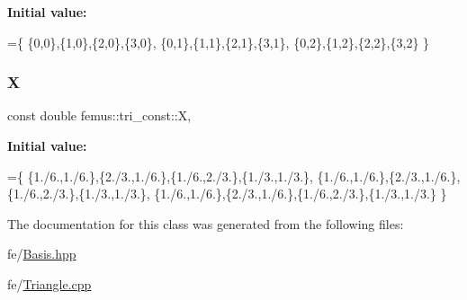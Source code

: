 {\bfseries Initial value\+:}
\begin{DoxyCode}
=\{ 
    \{0,0\},\{1,0\},\{2,0\},\{3,0\},
    \{0,1\},\{1,1\},\{2,1\},\{3,1\},
    \{0,2\},\{1,2\},\{2,2\},\{3,2\}
  \}
\end{DoxyCode}
\mbox{\label{classfemus_1_1tri__const_abfe45c8c83921a5fc439a70b3f30aa10}} 
\subsubsection{\texorpdfstring{X}{X}}
{\footnotesize\ttfamily const double femus\+::tri\+\_\+const\+::X\hspace{0.3cm}{\ttfamily [static]}, {\ttfamily [protected]}}

{\bfseries Initial value\+:}
\begin{DoxyCode}
=\{ 
    \{1./6.,1./6.\},\{2./3.,1./6.\},\{1./6.,2./3.\},\{1./3.,1./3.\},
    \{1./6.,1./6.\},\{2./3.,1./6.\},\{1./6.,2./3.\},\{1./3.,1./3.\},
    \{1./6.,1./6.\},\{2./3.,1./6.\},\{1./6.,2./3.\},\{1./3.,1./3.\}
  \}
\end{DoxyCode}


The documentation for this class was generated from the following files\+:\begin{DoxyCompactItemize}
\item 
fe/\mbox{\hyperlink{_basis_8hpp}{Basis.\+hpp}}\item 
fe/\mbox{\hyperlink{_triangle_8cpp}{Triangle.\+cpp}}\end{DoxyCompactItemize}
